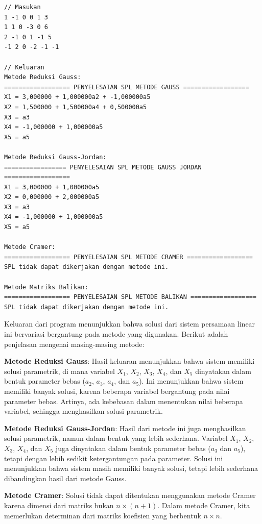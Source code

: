 \begin{enumerate}[label=(\alph*)]
\begin{lstlisting}[caption = spl-1b.txt]
// Masukan
1 -1 0 0 1 3
1 1 0 -3 0 6
2 -1 0 1 -1 5
-1 2 0 -2 -1 -1

// Keluaran
Metode Reduksi Gauss:
================== PENYELESAIAN SPL METODE GAUSS ==================
X1 = 3,000000 + 1,000000a2 + -1,000000a5
X2 = 1,500000 + 1,500000a4 + 0,500000a5
X3 = a3
X4 = -1,000000 + 1,000000a5
X5 = a5

Metode Reduksi Gauss-Jordan:
================= PENYELESAIAN SPL METODE GAUSS JORDAN ==================
X1 = 3,000000 + 1,000000a5
X2 = 0,000000 + 2,000000a5
X3 = a3
X4 = -1,000000 + 1,000000a5
X5 = a5

Metode Cramer:
================== PENYELESAIAN SPL METODE CRAMER ==================
SPL tidak dapat dikerjakan dengan metode ini.

Metode Matriks Balikan:
================== PENYELESAIAN SPL METODE BALIKAN ==================
SPL tidak dapat dikerjakan dengan metode ini.\end{lstlisting}

Keluaran dari program menunjukkan bahwa solusi dari sistem persamaan linear ini bervariasi bergantung pada metode yang digunakan. Berikut adalah penjelasan mengenai masing-masing metode:

\textbf{Metode Reduksi Gauss}: Hasil keluaran menunjukkan bahwa sistem memiliki solusi parametrik, di mana variabel \( X_1 \), \( X_2 \), \( X_3 \), \( X_4 \), dan \( X_5 \) dinyatakan dalam bentuk parameter bebas (\( a_2 \), \( a_3 \), \( a_4 \), dan \( a_5 \)). Ini menunjukkan bahwa sistem memiliki banyak solusi, karena beberapa variabel bergantung pada nilai parameter bebas. Artinya, ada kebebasan dalam menentukan nilai beberapa variabel, sehingga menghasilkan solusi parametrik.

\textbf{Metode Reduksi Gauss-Jordan}: Hasil dari metode ini juga menghasilkan solusi parametrik, namun dalam bentuk yang lebih sederhana. Variabel \( X_1 \), \( X_2 \), \( X_3 \), \( X_4 \), dan \( X_5 \) juga dinyatakan dalam bentuk parameter bebas (\( a_3 \) dan \( a_5 \)), tetapi dengan lebih sedikit ketergantungan pada parameter. Solusi ini menunjukkan bahwa sistem masih memiliki banyak solusi, tetapi lebih sederhana dibandingkan hasil dari metode Gauss.

\textbf{Metode Cramer}: Solusi tidak dapat ditentukan menggunakan metode Cramer karena dimensi dari matriks bukan \(n \times (n+1)\). Dalam metode Cramer, kita memerlukan determinan dari matriks koefisien yang berbentuk \(n \times n\).


\end{enumerate}

